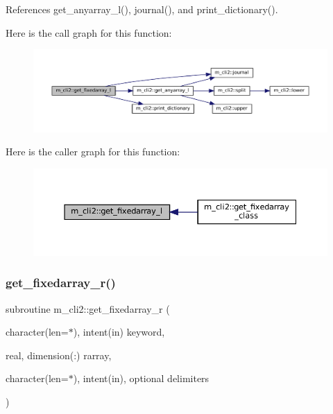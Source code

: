 References get\+\_\+anyarray\+\_\+l(), journal(), and print\+\_\+dictionary().

Here is the call graph for this function\+:\nopagebreak
\begin{figure}[H]
\begin{center}
\leavevmode
\includegraphics[width=350pt]{namespacem__cli2_a65ffe8c7a444db5db3be3f6edecef008_cgraph}
\end{center}
\end{figure}
Here is the caller graph for this function\+:\nopagebreak
\begin{figure}[H]
\begin{center}
\leavevmode
\includegraphics[width=350pt]{namespacem__cli2_a65ffe8c7a444db5db3be3f6edecef008_icgraph}
\end{center}
\end{figure}
\mbox{\label{namespacem__cli2_afbec790abad0dca990c0a61cd2d9e9ae}} 
\subsubsection{\texorpdfstring{get\+\_\+fixedarray\+\_\+r()}{get\_fixedarray\_r()}}
{\footnotesize\ttfamily subroutine m\+\_\+cli2\+::get\+\_\+fixedarray\+\_\+r (\begin{DoxyParamCaption}\item[{character(len=$\ast$), intent(in)}]{keyword,  }\item[{real, dimension(\+:)}]{rarray,  }\item[{character(len=$\ast$), intent(in), optional}]{delimiters }\end{DoxyParamCaption})\hspace{0.3cm}{\ttfamily [private]}}



